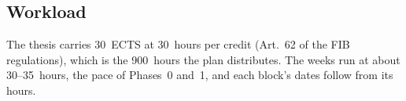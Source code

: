 
\subsection{Workload}
\label{subsec:workload}

The thesis carries 30~ECTS at 30~hours per credit (Art.~62 of the
FIB regulations), which is the 900~hours the plan distributes. The
weeks run at about 30--35~hours, the pace of Phases~0 and~1, and each
block's dates follow from its hours.
